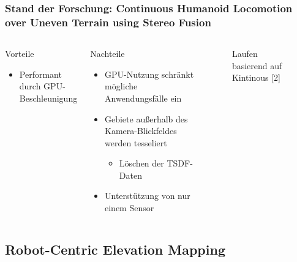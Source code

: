     
    \begin{frame}[t]
    \frametitle{Stand der Forschung: Continuous Humanoid Locomotion over Uneven Terrain using Stereo Fusion}

    \begin{columns}[t]
      \column[]{6cm}
      \vspace{-0.5cm}
      \begin{exampleblock}{Vorteile}
	  \begin{itemize}
	    \item Performant durch GPU-Beschleunigung
	  \end{itemize} 
	\end{exampleblock}
	
	\begin{alertblock}{Nachteile}
	 \begin{itemize}
	\item GPU-Nutzung schränkt mögliche Anwendungsfälle ein
	\item Gebiete außerhalb des Kamera-Blickfeldes werden tesseliert 
	\begin{itemize}
	\item Löschen der TSDF-Daten
	\end{itemize}
	\item Unterstützung von nur einem Sensor

      \end{itemize}
	\end{alertblock}
     

      \column{6cm}
      
       \begin{figure}[h]
 	\centering
 	\caption{Laufen basierend auf Kintinous [2]} 
       \end{figure}
  
    \end{columns}
    \end{frame}

 \subsection*{Robot-Centric Elevation Mapping}
 
